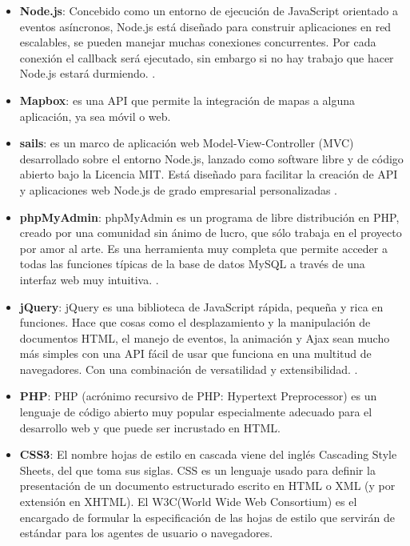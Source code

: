 \begin{itemize}
	
	\item \textbf{Node.js}: Concebido como un entorno de ejecución de JavaScript orientado a eventos asíncronos, Node.js está diseñado para construir aplicaciones en red escalables, se pueden manejar muchas conexiones concurrentes. Por cada conexión el callback será ejecutado, sin embargo si no hay trabajo que hacer Node.js estará durmiendo. \cite{node}.
	
	\item \textbf{Mapbox}: es una API que permite la integración de mapas a alguna aplicación, ya sea móvil o web\cite{mapbox}.
	
	\item \textbf{sails}: es un marco de aplicación web Model-View-Controller (MVC) desarrollado sobre el entorno Node.js, lanzado como software libre y de código abierto bajo la Licencia MIT. Está diseñado para facilitar la creación de API y aplicaciones web Node.js de grado empresarial personalizadas \cite{sails}.
	
	
	\item \textbf{phpMyAdmin}: phpMyAdmin es un programa de libre distribución en PHP, creado por una comunidad sin ánimo de lucro, que sólo trabaja en el proyecto por amor al arte. Es una herramienta muy completa que permite acceder a todas las funciones típicas de la base de datos MySQL a través de una interfaz web muy intuitiva. \cite{phpMyAdmin}.
		
	\item \textbf{jQuery}: jQuery es una biblioteca de JavaScript rápida, pequeña y rica en funciones. Hace que cosas como el desplazamiento y la manipulación de documentos HTML, el manejo de eventos, la animación y Ajax sean mucho más simples con una API fácil de usar que funciona en una multitud de navegadores. Con una combinación de versatilidad y extensibilidad. \cite{jQuery}.
	
	\item \textbf{PHP}: PHP (acrónimo recursivo de PHP: Hypertext Preprocessor) es un lenguaje de código abierto muy popular especialmente adecuado para el desarrollo web y que puede ser incrustado en HTML. \cite{PHP}
	
		
	\item \textbf{CSS3}: El nombre hojas de estilo en cascada viene del inglés Cascading Style Sheets, del que toma sus siglas. CSS es un lenguaje usado para definir la presentación de un documento estructurado escrito en HTML o XML (y por extensión en XHTML). El W3C(World Wide Web Consortium) es el encargado de formular la especificación de las hojas de estilo que servirán de estándar para los agentes de usuario o navegadores. \cite{CSS3}
	

\end{itemize}
